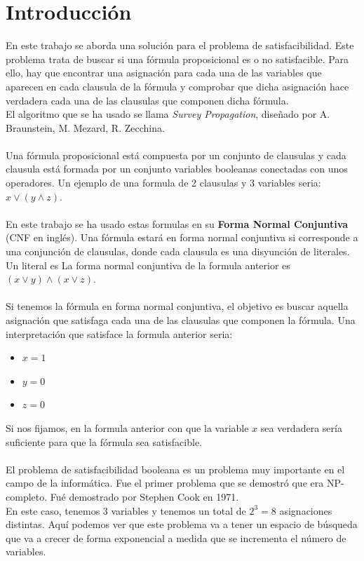 \section{Introducción}
En este trabajo se aborda una solución para el problema de satisfacibilidad. Este problema trata de buscar si una fórmula proposicional es o no satisfacible. Para ello, hay que encontrar una asignación para cada una de las variables que aparecen en cada clausula de la fórmula y comprobar que dicha asignación hace verdadera cada una de las clausulas que componen dicha fórmula.\\
El algoritmo que se ha usado se llama \textit{Survey Propagation}, diseñado por A. Braunstein, M. Mezard, R. Zecchina. \\\\
Una fórmula proposicional está compuesta por un conjunto de clausulas y cada clausula está formada por un conjunto variables booleanas conectadas con unos operadores. Un ejemplo de una formula de 2 clausulas y 3 variables seria: $x \lor (y \land z)$.\\\\
En este trabajo se ha usado estas formulas en su \textbf{Forma Normal Conjuntiva} (CNF en inglés).
Una fórmula estará en forma normal conjuntiva si corresponde a una conjunción de clausulas, donde cada clausula es una disyunción de literales. Un literal es La forma normal conjuntiva de la formula anterior es $(x \lor y)\land (x \lor z)$.\\\\
Si tenemos la fórmula en forma normal conjuntiva, el objetivo es buscar aquella asignación que satisfaga cada una de las clausulas que componen la fórmula. Una interpretación que satisface la formula anterior seria:
\begin{itemize}
	\item $x=1$
	\item $y=0$
	\item $z=0$
\end{itemize}
Si nos fijamos, en la formula anterior con que la variable $x$ sea verdadera sería suficiente para que la fórmula sea satisfacible.\\\\
El problema de satisfacibilidad booleana es un problema muy importante en el campo de la informática. Fue el primer problema que se demostró que era NP-completo. Fué demostrado por Stephen Cook en 1971.\\
En este caso, tenemos 3 variables y tenemos un total de $2^3 = 8$ asignaciones distintas. Aquí podemos ver que este problema va a tener un espacio de búsqueda que va a crecer de forma exponencial a medida que se incrementa el número de variables. 
